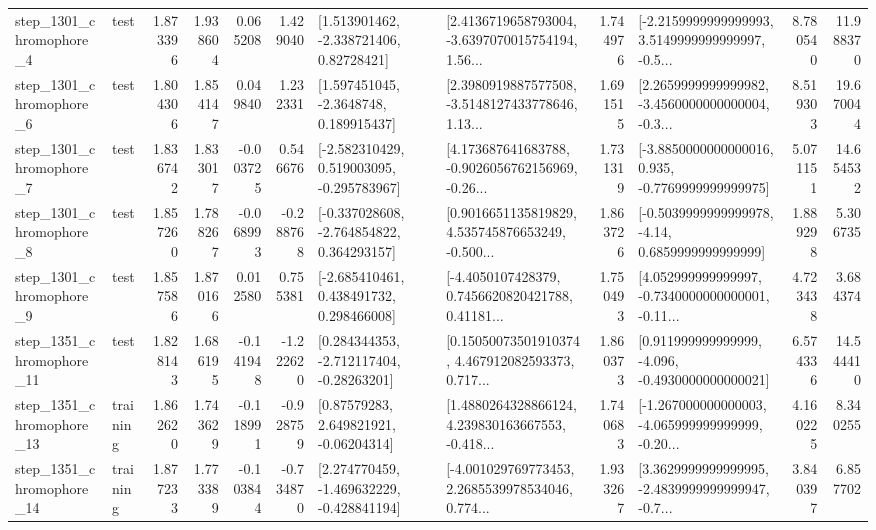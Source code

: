 \begin{tabular}{llrrrrllrlrr}
  step\_1301\_chromophore\_4 &      test &      1.873396 &    1.938604 &      0.065208 &  1.429040 &     [1.513901462, -2.338721406, 0.82728421] &  [2.4136719658793004, -3.6397070015754194, 1.56... &       1.744976 &  [-2.2159999999999993, 3.5149999999999997, -0.5... &            8.780540 &         11.988370 \\
  step\_1301\_chromophore\_6 &      test &      1.804306 &    1.854147 &      0.049840 &  1.232331 &      [1.597451045, -2.3648748, 0.189915437] &  [2.3980919887577508, -3.5148127433778646, 1.13... &       1.691515 &  [2.2659999999999982, -3.4560000000000004, -0.3... &            8.519303 &         19.670044 \\
  step\_1301\_chromophore\_7 &      test &      1.836742 &    1.833017 &     -0.003725 &  0.546676 &   [-2.582310429, 0.519003095, -0.295783967] &  [4.173687641683788, -0.9026056762156969, -0.26... &       1.731319 &  [-3.8850000000000016, 0.935, -0.7769999999999975] &            5.071151 &         14.654532 \\
  step\_1301\_chromophore\_8 &      test &      1.857260 &    1.788267 &     -0.068993 & -0.288768 &   [-0.337028608, -2.764854822, 0.364293157] &  [0.9016651135819829, 4.535745876653249, -0.500... &       1.863726 &   [-0.5039999999999978, -4.14, 0.6859999999999999] &            1.889298 &          5.306735 \\
  step\_1301\_chromophore\_9 &      test &      1.857586 &    1.870166 &      0.012580 &  0.755381 &    [-2.685410461, 0.438491732, 0.298466008] &  [-4.4050107428379, 0.7456620820421788, 0.41181... &       1.750493 &  [4.052999999999997, -0.7340000000000001, -0.11... &            4.723438 &          3.684374 \\
 step\_1351\_chromophore\_11 &      test &      1.828143 &    1.686195 &     -0.141948 & -1.222620 &    [0.284344353, -2.712117404, -0.28263201] &  [0.15050073501910374, 4.467912082593373, 0.717... &       1.860373 &   [0.911999999999999, -4.096, -0.4930000000000021] &            6.574336 &         14.544410 \\
 step\_1351\_chromophore\_13 &  training &      1.862620 &    1.743629 &     -0.118991 & -0.928759 &      [0.87579283, 2.649821921, -0.06204314] &  [1.4880264328866124, 4.239830163667553, -0.418... &       1.740683 &  [-1.267000000000003, -4.065999999999999, -0.20... &            4.160225 &          8.340255 \\
 step\_1351\_chromophore\_14 &  training &      1.877233 &    1.773389 &     -0.103844 & -0.734870 &   [2.274770459, -1.469632229, -0.428841194] &  [-4.001029769773453, 2.2685539978534046, 0.774... &       1.933267 &  [3.3629999999999995, -2.4839999999999947, -0.7... &            3.840397 &          6.857702 \\

\end{tabular}
